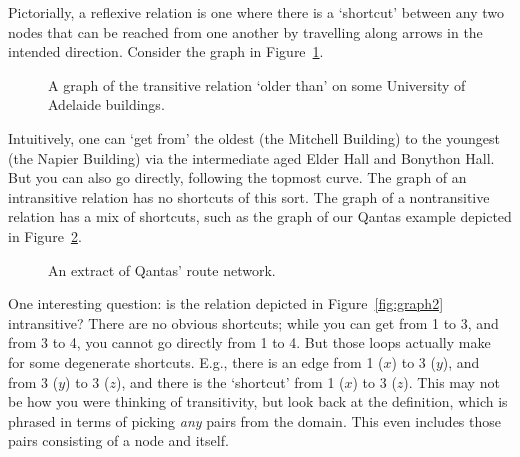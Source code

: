 Pictorially, a reflexive relation is one where there is a `shortcut' between any two nodes that can be reached from one another by travelling along arrows in the intended direction. Consider the graph in Figure~\ref{fig:trans}. 
\begin{figure}[t]
	\caption{A graph of the transitive relation `older than' on some University of Adelaide buildings.\label{fig:trans}}
\end{figure} Intuitively, one can `get from' the oldest (the Mitchell Building) to the youngest (the Napier Building) via the intermediate aged Elder Hall and Bonython Hall. But you can also go directly, following the topmost curve. The graph of an intransitive relation has no shortcuts of this sort. The graph of a nontransitive relation has a mix of shortcuts, such as the graph of our Qantas example depicted in Figure~\ref{fig:qantas}. 
\begin{figure}[b]
	\caption{An extract of Qantas' route network.\label{fig:qantas}}
\end{figure}

One interesting question: is the relation depicted in Figure~\ref{fig:graph2} intransitive? There are no obvious shortcuts; while you can get from 1 to 3, and from 3 to 4, you cannot go directly from 1 to 4. But those loops actually make for some degenerate shortcuts. E.g., there is an edge from 1 ($x$) to 3 ($y$), and from 3 ($y$) to 3 ($z$), and there is the `shortcut' from 1 ($x$) to 3 ($z$). This may not be how you were thinking of transitivity, but look back at the definition, which is phrased in terms of picking \emph{any} pairs from the domain. This even includes those pairs consisting of a node and itself.

